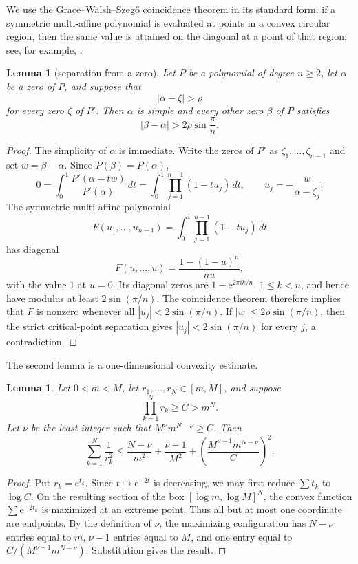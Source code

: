 \documentclass[11pt]{article}
\newtheorem{lemma}[theorem]{Lemma}
\theoremstyle{remark}
\newcommand{\e}{\mathrm e}
\begin{document}
We use the Grace--Walsh--Szeg\H{o} coincidence theorem in its standard form:
if a symmetric multi-affine polynomial is evaluated at points in a convex
circular region, then the same value is attained on the diagonal at a point of
that region; see, for example, \cite[Proposition~1]{BrandenWagner}.

\begin{lemma}[separation from a zero]\label{lem:separation}
Let $P$ be a polynomial of degree $n\ge2$, let $\alpha$ be a zero of $P$, and
suppose that
\[
 |\alpha-\zeta|>\rho
\]
for every zero $\zeta$ of $P'$.  Then $\alpha$ is simple and every other zero
$\beta$ of $P$ satisfies
\[
 |\beta-\alpha|>2\rho\sin\frac{\pi}{n}.
\]
\end{lemma}

\begin{proof}
The simplicity of $\alpha$ is immediate.  Write the zeros of $P'$ as
$\zeta_1,\ldots,\zeta_{n-1}$ and set $w=\beta-\alpha$.  Since
$P(\beta)=P(\alpha)$,
\[
 0=\int_0^1\frac{P'(\alpha+tw)}{P'(\alpha)}\,dt
  =\int_0^1\prod_{j=1}^{n-1}(1-tu_j)\,dt,
 \qquad
 u_j=-\frac{w}{\alpha-\zeta_j}.
\]
The symmetric multi-affine polynomial
\[
 F(u_1,\ldots,u_{n-1})=\int_0^1\prod_{j=1}^{n-1}(1-tu_j)\,dt
\]
has diagonal
\[
 F(u,\ldots,u)=\frac{1-(1-u)^n}{nu},
\]
with the value $1$ at $u=0$.  Its diagonal zeros are
$1-\e^{2\pi i k/n}$, $1\le k<n$, and hence have modulus at least
$2\sin(\pi/n)$.  The coincidence theorem therefore implies that $F$ is
nonzero whenever all $|u_j|<2\sin(\pi/n)$.  If
$|w|\le2\rho\sin(\pi/n)$, then the strict critical-point separation gives
$|u_j|<2\sin(\pi/n)$ for every $j$, a contradiction.
\end{proof}

The second lemma is a one-dimensional convexity estimate.

\begin{lemma}\label{lem:sigma}
Let $0<m<M$, let $r_1,\ldots,r_N\in[m,M]$, and suppose
\[
 \prod_{k=1}^N r_k\ge C>m^N.
\]
Let $\nu$ be the least integer such that $M^\nu m^{N-\nu}\ge C$.  Then
\[
 \sum_{k=1}^N\frac1{r_k^2}
 \le
 \frac{N-\nu}{m^2}+\frac{\nu-1}{M^2}
 +\left(\frac{M^{\nu-1}m^{N-\nu}}{C}\right)^2.
\]
\end{lemma}

\begin{proof}
Put $r_k=\e^{t_k}$.  Since $t\mapsto\e^{-2t}$ is decreasing, we may first
reduce $\sum t_k$ to $\log C$.  On the resulting section of the box
$[\log m,\log M]^N$, the convex function $\sum\e^{-2t_k}$ is maximized at an
extreme point.  Thus all but at most one coordinate are endpoints.  By the
definition of $\nu$, the maximizing configuration has $N-\nu$ entries equal
to $m$, $\nu-1$ entries equal to $M$, and one entry equal to
$C/(M^{\nu-1}m^{N-\nu})$.  Substitution gives the result.
\end{proof}
\end{document}
